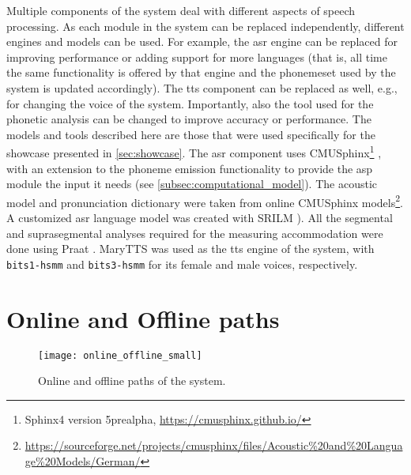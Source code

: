 Multiple components of the system deal with different aspects of speech processing.
As each module in the system can be replaced independently, different engines and models can be used.
For example, the \ac{asr} engine can be replaced for improving performance or adding support for more languages (that is, all time the same functionality is offered by that engine and the phonemeset used by the system is updated accordingly).
The \ac{tts} component can be replaced as well, e.g., for changing the voice of the system.
Importantly, also the tool used for the phonetic analysis can be changed to improve accuracy or performance.
The models and tools described here are those that were used specifically for the showcase presented in \cref{sec:showcase}.
The \ac{asr} component uses CMUSphinx\footnote{Sphinx4 version 5prealpha, \url{https://cmusphinx.github.io/}} \citep{Lamere2003sphinx}, with an extension to the phoneme emission functionality to provide the \ac{asp} module the input it needs (see \cref{subsec:computational_model}).
The acoustic model and pronunciation dictionary were taken from online CMUSphinx models\footnote{\url{https://sourceforge.net/projects/cmusphinx/files/Acoustic\%20and\%20Language\%20Models/German/}}.
A customized \ac{asr} language model was created with SRILM \citep{Stolcke2002SRILM}).
All the segmental and suprasegmental analyses required for the measuring accommodation were done using Praat \citep{Boersma2018praat}.
MaryTTS \citep{LeMaguer2017uprooted} was used as the \ac{tts} engine of the system, with \texttt{bits1-hsmm} and \texttt{bits3-hsmm} for its female and male voices, respectively.

\section{Online and Offline paths}
\label{sec:online_and_offline_paths}

\begin{figure}[t]
	\centering
	\texttt{[image: online\_offline\_small]}
	\caption[Online (orange) and offline (blue) paths of the responsive \acl{sds}]
		{Online and offline paths of the system.}
	\label{fig:online_offline_paths}
\end{figure}

